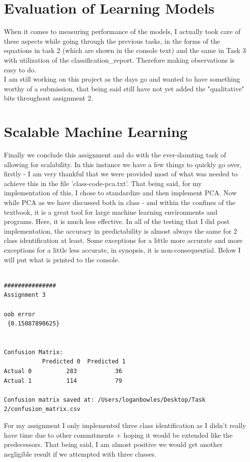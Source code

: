 \documentclass[conference]{IEEEtran} %
\begin{document}
\section{Evaluation of Learning Models}
When it comes to measuring performance of the models, I actually took care of these aspects while going through the previous tasks, in the forms of the equations in task 2 (which are shown in the console text) and the same in Task 3 with utilization of the classification\_report.  Therefore making observations is easy to do. \\ I am still working on this project as the days go and wanted to have something worthy of a submission, that being said still have not yet added the "qualitative" bits throughout assignment 2.

\section{Scalable Machine Learning}
Finally we conclude this assignment and do with the ever-daunting task of allowing for scalability.  In this instance we have a few things to quickly go over, firstly - I am very thankful that we were provided most of what was needed to achieve this in the file 'class-code-pca.txt'.  That being said, for my implementation of this, I chose to standardize and then implement PCA.  Now while PCA as we have discussed both in class - and within the confines of the textbook, it is a great tool for large machine learning environments and programs.  Here, it is much less effective.  In all of the testing that I did post implementation, the accuracy in predictability is almost always the same for 2 class identification at least.  Some exceptions for a little more accurate and more exceptions for a little less accurate, in synopsis, it is non-consequential.  Below I will put what is printed to the console.


\begin{lstlisting}

###############
Assignment 3

oob error 
 {0.15087890625} 


Confusion Matrix:
           Predicted 0  Predicted 1
Actual 0          283           36
Actual 1          114           79 

Confusion matrix saved at: /Users/loganbowles/Desktop/Task 2/confusion_matrix.csv 

\end{lstlisting}

For my assignment I only implemented three class identification as I didn't really have time due to other commitments + hoping it would be extended like the predecessors.  That being said, I am almost positive we would get another negligible result if we attempted with three classes.



\end{document}

